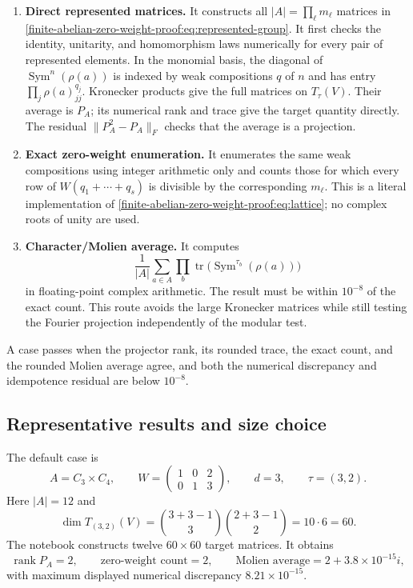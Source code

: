 \documentclass[10pt]{article}
\newcommand{\Sym}{\operatorname{Sym}}
\begin{document}
\begin{enumerate}[leftmargin=*,label=\textbf{\arabic*.}]
\item \textbf{Direct represented matrices.}
It constructs all $|A|=\prod_\ell m_\ell$ matrices in
\eqref{finite-abelian-zero-weight-proof:eq:represented-group}.  It first checks the identity, unitarity, and
homomorphism laws numerically for every pair of represented elements.  In the
monomial basis, the diagonal of
$\Sym^n(\rho(a))$ is indexed by weak compositions $q$ of $n$ and has entry
$\prod_j\rho(a)_{jj}^{q_j}$.  Kronecker products give the full matrices on
$T_\tau(V)$.  Their average is $P_A$; its numerical rank and trace give the
target quantity directly.  The residual $\lVert P_A^2-P_A\rVert_F$ checks
that the average is a projection.

\item \textbf{Exact zero-weight enumeration.}
It enumerates the same weak compositions using integer arithmetic only and
counts those for which every row of $W(q_1+\cdots+q_s)$ is divisible by the
corresponding $m_\ell$.  This is a literal implementation of
\eqref{finite-abelian-zero-weight-proof:eq:lattice}; no complex roots of unity are used.

\item \textbf{Character/Molien average.}
It computes
\[
 \frac1{|A|}\sum_{a\in A}
 \prod_b\operatorname{tr}\bigl(\Sym^{\tau_b}(\rho(a))\bigr)
\]
in floating-point complex arithmetic.  The result must be within $10^{-8}$ of
the exact count.  This route avoids the large Kronecker matrices while still
testing the Fourier projection independently of the modular test.
\end{enumerate}

A case passes when the projector rank, its rounded trace, the exact count, and
the rounded Molien average agree, and both the numerical discrepancy and
idempotence residual are below $10^{-8}$.

\subsection{Representative results and size choice}

The default case is
\[
 A=C_3\times C_4,\qquad
 W=\begin{pmatrix}1&0&2\\0&1&3\end{pmatrix},\qquad
 d=3,\qquad \tau=(3,2).
\]
Here $|A|=12$ and
\[
\dim T_{(3,2)}(V)=
\binom{3+3-1}{3}\binom{2+3-1}{2}=10\cdot6=60.
\]
\clearpage
\thispagestyle{fancy}
The notebook constructs twelve $60\times60$ target matrices.  It obtains
\[
 \operatorname{rank}P_A=2,\qquad
 \text{zero-weight count}=2,\qquad
 \text{Molien average}=2+3.8\times10^{-15}i,
\]
with maximum displayed numerical discrepancy $8.21\times10^{-15}$.
\end{document}
